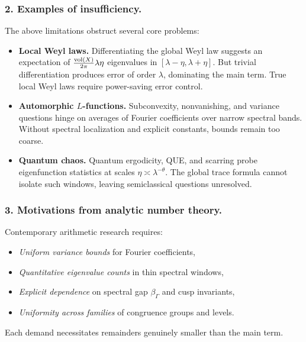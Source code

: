 \medskip

\subsubsection*{2. Examples of insufficiency.}
The above limitations obstruct several core problems:

\begin{itemize}
  \item \textbf{Local Weyl laws.}
        Differentiating the global Weyl law suggests an expectation
        of $\tfrac{\operatorname{vol}(X)}{2\pi}\lambda\eta$ eigenvalues in $[\lambda-\eta,\lambda+\eta]$.
        But trivial differentiation produces error of order $\lambda$, dominating the main term.
        True local Weyl laws require power-saving error control.

  \item \textbf{Automorphic $L$-functions.}
        Subconvexity, nonvanishing, and variance questions hinge on averages of Fourier coefficients
        over narrow spectral bands. Without spectral localization and explicit constants,
        bounds remain too coarse.

  \item \textbf{Quantum chaos.}
        Quantum ergodicity, QUE, and scarring probe eigenfunction statistics at scales
        $\eta\asymp\lambda^{-\theta}$. The global trace formula cannot isolate such windows,
        leaving semiclassical questions unresolved.
\end{itemize}

\medskip

\subsubsection*{3. Motivations from analytic number theory.}
Contemporary arithmetic research requires:
\begin{itemize}
  \item \emph{Uniform variance bounds} for Fourier coefficients,
  \item \emph{Quantitative eigenvalue counts} in thin spectral windows,
  \item \emph{Explicit dependence} on spectral gap $\beta_\Gamma$ and cusp invariants,
  \item \emph{Uniformity across families} of congruence groups and levels.
\end{itemize}
Each demand necessitates remainders genuinely smaller than the main term.

\medskip

